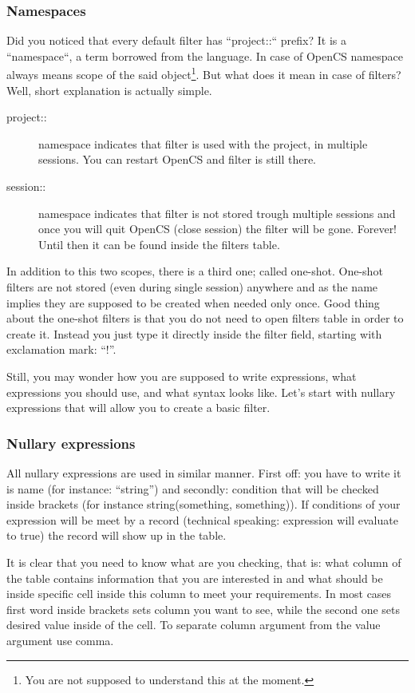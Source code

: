 \subsubsection{Namespaces}
Did you noticed that every default filter has ``project::`` prefix? It is a ``namespace``, a term borrowed from the \CPP{} language.
In case of OpenCS namespace always means scope of the said object\footnote{You are not supposed to understand this at the moment.}.
But what does it mean in case of filters? Well, short explanation is actually simple.
\begin{description}
 \item[project::] namespace indicates that filter is used with the project, in multiple sessions. You can restart Open{CS} and filter
 is still there.
 \item[session::] namespace indicates that filter is not stored trough multiple sessions and once you will quit Open{CS} (close session)
 the filter will be gone. Forever! Until then it can be found inside the filters table.
\end{description}
In addition to this two scopes, there is a third one; called one-shot. One-shot filters are not stored (even during single session)
anywhere and as the name implies they are supposed to be created when needed only once. Good thing about the one-shot filters is that
you do not need to open filters table in order to create it. Instead you just type it directly inside the filter field, starting with
exclamation mark: ``!''.

Still, you may wonder how you are supposed to write expressions, what expressions you should use, and what syntax looks like. Let's start
with nullary expressions that will allow you to create a basic filter.

\subsubsection{Nullary expressions}
All nullary expressions are used in similar manner. First off: you have to write it is name (for instance: ``string'') and secondly:
condition that will be checked inside brackets (for instance string(something, something)). If conditions of your expression will be meet
by a record (technical speaking: expression will evaluate to true) the record will show up in the table.

It is clear that you need to know what are you checking, that is: what column of the table contains information that you are interested
in and what should be inside specific cell inside this column to meet your requirements. In most cases first word inside brackets sets column
you want to see, while the second one sets desired value inside of the cell. To separate column argument from the value argument use comma.  

